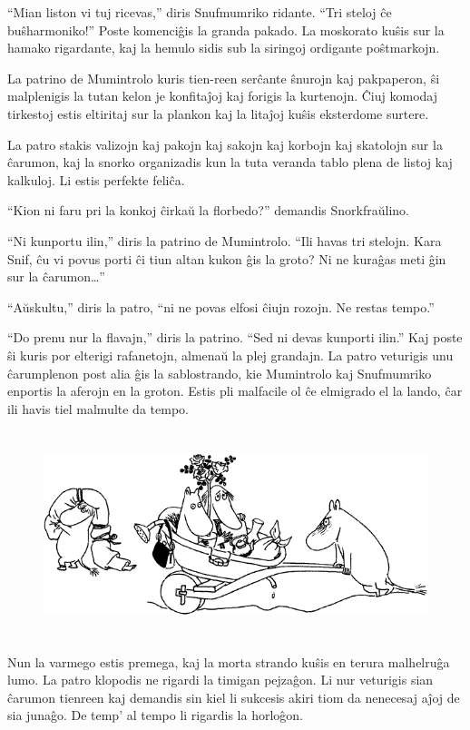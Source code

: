 ``Mian liston vi tuj ricevas,'' diris Snufmumriko ridante. ``Tri steloj ĉe buŝharmoniko!''
\sectionbreak
Poste komenciĝis la granda pakado. La moskorato kuŝis sur la hamako rigardante, kaj la hemulo sidis sub la siringoj ordigante poŝtmarkojn.

La patrino de Mumintrolo kuris tien-reen serĉante ŝnurojn kaj pakpaperon, ŝi malplenigis la tutan kelon je konfitaĵoj kaj forigis la kurtenojn. Ĉiuj komodaj tirkestoj estis eltiritaj sur la plankon kaj la litaĵoj kuŝis eksterdome surtere.

La patro stakis valizojn kaj pakojn kaj sakojn kaj korbojn kaj skatolojn sur la ĉarumon, kaj la snorko organizadis kun la tuta veranda tablo plena de listoj kaj kalkuloj. Li estis perfekte feliĉa.

``Kion ni faru pri la konkoj ĉirkaŭ la florbedo?'' demandis Snorkfraŭlino.

``Ni kunportu ilin,'' diris la patrino de Mumintrolo. ``Ili havas tri stelojn. Kara Snif, ĉu vi povus porti ĉi tiun altan kukon ĝis la groto? Ni ne kuraĝas meti ĝin sur la ĉarumon{\ldots}''

``Aŭskultu,'' diris la patro, ``ni ne povas elfosi ĉiujn rozojn. Ne restas tempo.''

``Do prenu nur la flavajn,'' diris la patrino. ``Sed ni devas kunporti ilin.'' Kaj poste ŝi kuris por elterigi rafanetojn, almenaŭ la plej grandajn. La patro veturigis unu ĉarumplenon post alia ĝis la sablostrando, kie Mumintrolo kaj Snufmumriko enportis la aferojn en la groton. Estis pli malfacile ol ĉe elmigrado el la lando, ĉar ili havis tiel malmulte da tempo.

\begin{figure}[htbp]
\centering
\includegraphics[width=400pt,height=170pt]{9-4.png}
\caption{}
\label{9-4}
\end{figure}

Nun la varmego estis premega, kaj la morta strando kuŝis en terura malhelruĝa lumo. La patro klopodis ne rigardi la timigan pejzaĝon. Li nur veturigis sian ĉarumon tienreen kaj demandis sin kiel li sukcesis akiri tiom da nenecesaj aĵoj de sia junaĝo. De temp' al tempo li rigardis la horloĝon.

